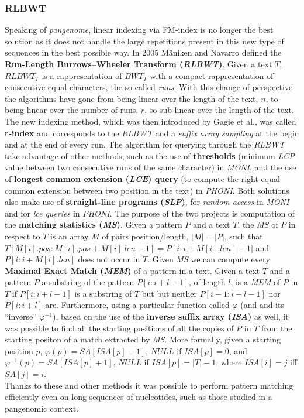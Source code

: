 \documentclass[a4paper,11pt, oneside]{article}
\begin{document}
\subsubsection*{RLBWT}
Speaking of \textit{pangenome}, linear indexing via FM-index is no longer the
best 
solution as it does not handle the large repetitions present in this new type of
sequences in the best possible way. In 2005 M\"{a}niken and Navarro defined
the \textbf{Run-Length Burrows–Wheeler Transform (\textit{RLBWT})}. Given a text
$T$, $RLBWT_T$ is a rappresentation of $BWT_T$ with a compact rappresentation of
consecutive equal characters, the so-called \textit{runs}. With this change of
perspective the algorithms have gone from being linear over the length of the
text, $n$, to being linear over the number of runs, $r$, so sub-linear over the
length of the text. \\ 
The new indexing method, which was then introduced by Gagie et
al., was called \textbf{r-index} and corresponds to the
\textit{RLBWT} and a \textit{suffix array sampling} at the begin and at the end
of every run. The 
algorithm for querying through the \textit{RLBWT} take advantage of other
methods, such as the use of \textbf{thresholds} (minimum
\textit{LCP} value between two consecutive runs of the same character) in
\textit{MONI}, and the use of \textbf{longest common extension (\textit{LCE})
  query} (to compute the right equal common extension between two position in
the text) in \textit{PHONI}. Both solutions also make use of
\textbf{straight-line programs (\textit{SLP})}, for \textit{random 
  access} in \textit{MONI} and for \textit{lce queries} in \textit{PHONI}.
The purpose of the two projects is computation of the \textbf{matching
  statistics (\textit{MS})}. Given a 
pattern $P$ and a text $T$, the \textit{MS} of $P$ in respect to $T$ is an
array 
$M$ of pairs position/length, $|M|=|P|$, such that
$T[M[i].pos:M[i].pos+M[i].len-1]=P[i:i+M[i].len]-1]$ and $P[i:i+M[i].len]$ does
not occur in $T$. Given \textit{MS} we can compute every \textbf{Maximal Exact
  Match (\textit{MEM})} of a pattern in a text. Given a text $T$ and a pattern
$P$ a substring of the pattern $P[i : i+l-1]$, of length $l$, is a \textit{MEM}
of $P$ in $T$ if $P[i:i+l-1]$ is a substring of $T$ but but neither
$P[i-1:i+l-1]$ nor $P[i:i+l]$ are. Furthermore, using a particular function
called $\varphi$ (and and its ``inverse'' $\varphi^{-1}$), based on the use of
the \textbf{inverse 
  suffix array (\textit{ISA})} as well, it was possible to find all the starting
positions of all the copies of $P$ in $T$ from the starting positon of a match
extracted by \textit{MS}. More formally, given a starting position $p$,
$\varphi(p)=SA[ISA[p]-1]$, $NULL$ if $ISA[p]=0$, and 
$\varphi^{-1}(p)=SA[ISA[p]+1]$, $NULL$ if $ISA[p]=|T|-1$, where $ISA[i]=j$ iff
$SA[j]=i$.\\   
Thanks to these and other methods it was possible to perform pattern matching
efficiently even on long sequences of nucleotides, such as those studied in
a pangenomic context. 
\end{document}
